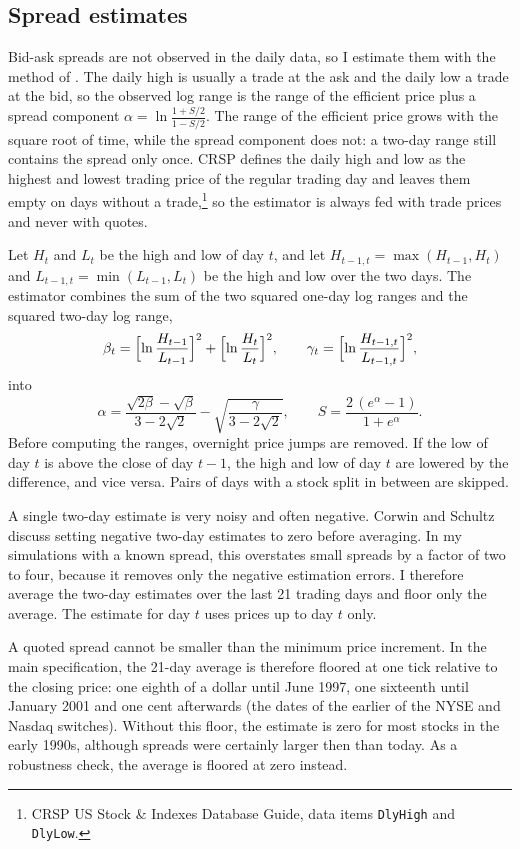 \documentclass[11pt,a4paper]{article}
\theoremstyle{definition}
\theoremstyle{remark}
\begin{document}
\subsection{Spread estimates}

Bid-ask spreads are not observed in the daily data, so I estimate them with the
method of \citet{corwin2012simple}. The daily high is usually a trade at the ask
and the daily low a trade at the bid, so the observed log range is the range of
the efficient price plus a spread component $\alpha = \ln\frac{1+S/2}{1-S/2}$.
The range of the efficient price grows with the square root of time, while the
spread component does not: a two-day range still contains the spread only once.
CRSP defines the daily high and low as the highest and lowest trading price of
the regular trading day and leaves them empty on days without a
trade,\footnote{CRSP US Stock \& Indexes Database Guide, data items
\texttt{DlyHigh} and \texttt{DlyLow}.} so the estimator is always fed with
trade prices and never with quotes.

Let $H_t$ and $L_t$ be the high and low of day $t$, and let
$H_{t-1,t} = \max(H_{t-1}, H_t)$ and $L_{t-1,t} = \min(L_{t-1}, L_t)$ be the
high and low over the two days. The estimator combines the sum of the two
squared one-day log ranges and the squared two-day log range,
\[
  \beta_t = \Bigl[\ln\frac{H_{t-1}}{L_{t-1}}\Bigr]^2 + \Bigl[\ln\frac{H_t}{L_t}\Bigr]^2,
  \qquad
  \gamma_t = \Bigl[\ln\frac{H_{t-1,t}}{L_{t-1,t}}\Bigr]^2,
\]
into
\[
  \alpha = \frac{\sqrt{2\beta} - \sqrt{\beta}}{3 - 2\sqrt{2}} - \sqrt{\frac{\gamma}{3 - 2\sqrt{2}}},
  \qquad
  S = \frac{2\,(e^{\alpha} - 1)}{1 + e^{\alpha}} .
\]
Before computing the ranges, overnight price jumps are removed. If the low of
day $t$ is above the close of day $t-1$, the high and low of day $t$ are
lowered by the difference, and vice versa. Pairs of days with a stock split in
between are skipped.

A single two-day estimate is very noisy and often negative. Corwin and Schultz
discuss setting negative two-day estimates to zero before averaging. In my
simulations with a known spread, this overstates small spreads by a factor of
two to four, because it removes only the negative estimation errors. I
therefore average the two-day estimates over the last 21 trading days and
floor only the average. The estimate for day $t$ uses prices up to day $t$
only.

A quoted spread cannot be smaller than the minimum price increment. In the main
specification, the 21-day average is therefore floored at one tick relative to
the closing price: one eighth of a dollar until June 1997, one sixteenth until
January 2001 and one cent afterwards (the dates of the earlier of the NYSE and
Nasdaq switches). Without this floor, the estimate is zero for most stocks in
the early 1990s, although spreads were certainly larger then than today. As a
robustness check, the average is floored at zero instead.
\end{document}
